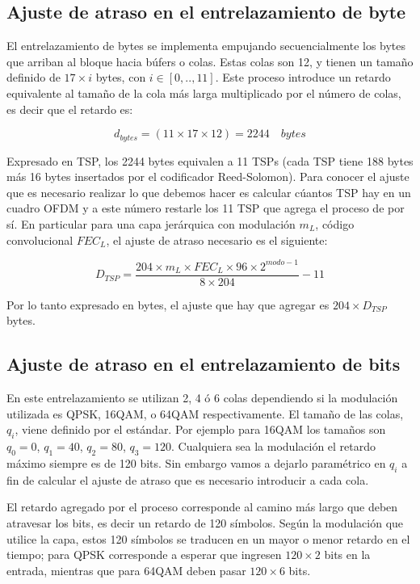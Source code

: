 \documentclass[journal,comsoc]{IEEEtran}
\begin{document}
\subsection{Ajuste de atraso en el entrelazamiento de byte}
El entrelazamiento de bytes se implementa empujando secuencialmente los bytes que arriban al bloque hacia búfers o colas. Estas colas son 12, y tienen un tamaño definido de $17 \times i$ bytes, con $i \in [0,..,11]$. Este proceso introduce un retardo equivalente al tamaño de la cola más larga multiplicado por el número de colas, es decir que el retardo es:

\begin{equation}
d_{bytes} = (11 \times 17 \times 12) = 2244 \quad bytes
\end{equation} 

Expresado en TSP, los 2244 bytes equivalen a 11 TSPs (cada TSP tiene 188 bytes más 16 bytes insertados por el codificador Reed-Solomon).
Para conocer el ajuste que es necesario realizar lo que debemos hacer es calcular cúantos TSP hay en un cuadro OFDM y a este número restarle los 11 TSP que agrega el proceso de por sí.
En particular para una capa jerárquica con modulación $m_L$, código convolucional $FEC_L$, el ajuste de atraso necesario es el siguiente:

\begin{equation}
D_{TSP} = \dfrac{204 \times m_L \times FEC_L \times 96 \times 2^{modo-1}}{8 \times 204} - 11 
\end{equation}

Por lo tanto expresado en bytes, el ajuste que hay que agregar es $204 \times D_{TSP}$ bytes.

\subsection{Ajuste de atraso en el entrelazamiento de bits}
En este entrelazamiento se utilizan 2, 4 ó 6 colas dependiendo si la modulación utilizada es QPSK, 16QAM, o 64QAM respectivamente. El tamaño de las colas, $q_i$, viene definido por el estándar. Por ejemplo para 16QAM los tamaños son $q_0 = 0$, $q_1 = 40$, $q_2 = 80$, $q_3 = 120$. Cualquiera sea la modulación el retardo máximo siempre es de 120 bits. Sin embargo vamos a dejarlo paramétrico en $q_i$ a fin de calcular el ajuste de atraso que es necesario introducir a cada cola.

El retardo agregado por el proceso corresponde al camino más largo que deben atravesar los bits, es decir un retardo de 120 símbolos. Según
la modulación que utilice la capa, estos 120 símbolos se traducen en un mayor o menor retardo en el tiempo; para QPSK corresponde a esperar que ingresen $120 \times 2$ bits en la entrada, mientras que para 64QAM deben pasar $120 \times 6$ bits.
\end{document}
